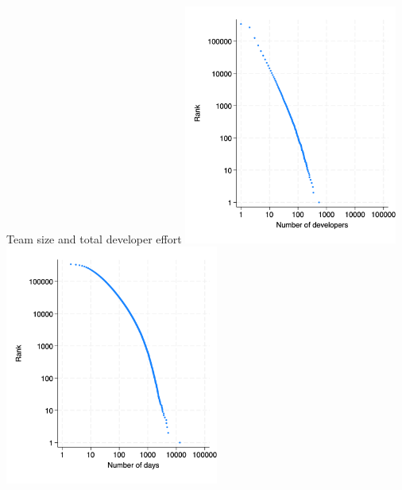 \documentclass[
  ignorenonframetext,
  aspectratio=1610,
]{beamer}
\begin{document}
\begin{frame}{Team size and total developer effort}
\protect\hypertarget{team-size-and-total-developer-effort}{}
\includegraphics[width=7cm,height=\textheight]{figures/developers_rank.png}
\includegraphics[width=7cm,height=\textheight]{figures/days_rank.png}
\end{frame}
\end{document}
